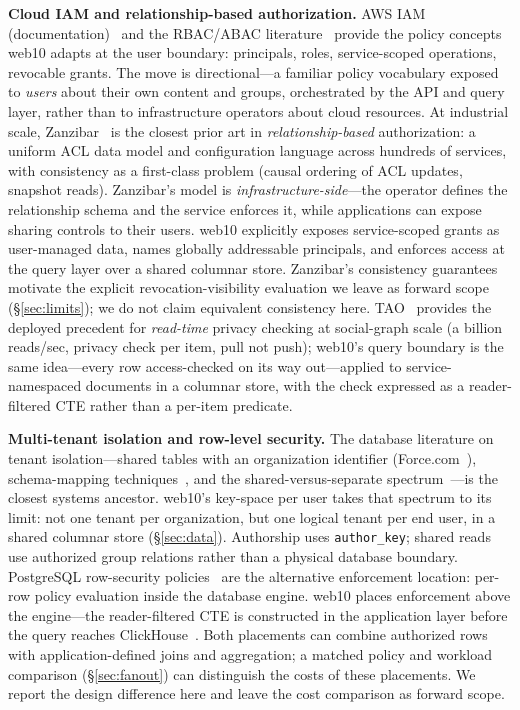 \documentclass[sigconf, nonacm]{acmart}
\begin{document}
\textbf{Cloud IAM and relationship-based authorization.}
AWS IAM (documentation)~\cite{awsiam} and the RBAC/ABAC
literature~\cite{ferraiolo1992, sandhu1996, abac2014} provide the policy
concepts web10 adapts at the user boundary: principals, roles,
service-scoped operations, revocable grants. The move is directional---a
familiar policy vocabulary exposed to \emph{users} about their own content
and groups, orchestrated by the API and query layer, rather than to
infrastructure operators about cloud resources. At industrial scale,
Zanzibar~\cite{zanzibar2019} is the closest prior art in
\emph{relationship-based} authorization: a uniform ACL data model and
configuration language across hundreds of services, with consistency as a
first-class problem (causal ordering of ACL updates, snapshot reads).
Zanzibar's model is \emph{infrastructure-side}---the operator defines the
relationship schema and the service enforces it, while applications can
expose sharing controls to their users. web10 explicitly exposes
service-scoped grants as user-managed data, names globally addressable
principals, and enforces access at the query layer over a shared columnar
store. Zanzibar's consistency guarantees motivate the explicit
revocation-visibility evaluation we leave as forward scope
(\S\ref{sec:limits}); we do not claim equivalent consistency here.
TAO~\cite{tao2013} provides the deployed precedent for \emph{read-time}
privacy checking at social-graph scale (a billion reads/sec, privacy check
per item, pull not push); web10's query boundary is the same idea---every
row access-checked on its way out---applied to service-namespaced documents
in a columnar store, with the check expressed as a reader-filtered CTE
rather than a per-item predicate.

\textbf{Multi-tenant isolation and row-level security.}
The database literature on tenant isolation---shared tables with an
organization identifier (Force.com~\cite{force2009}), schema-mapping
techniques~\cite{aulbach2008}, and the shared-versus-separate
spectrum~\cite{jacobs2007}---is the closest systems ancestor. web10's
key-space per user takes that spectrum to its limit: not one tenant per
organization, but one logical tenant per end user, in a shared columnar
store (\S\ref{sec:data}). Authorship uses \texttt{author\_key}; shared reads
use authorized group relations rather than a physical database boundary.
PostgreSQL row-security policies~\cite{postgres-rls} are the alternative
enforcement location: per-row policy evaluation inside the database engine.
web10 places enforcement above the engine---the reader-filtered CTE is
constructed in the application layer before the query reaches
ClickHouse~\cite{clickhouse2024}. Both placements can combine authorized
rows with application-defined joins and aggregation; a matched policy and
workload comparison (\S\ref{sec:fanout}) can distinguish the costs of these
placements. We report the design difference here and leave the cost
comparison as forward scope.
\end{document}
